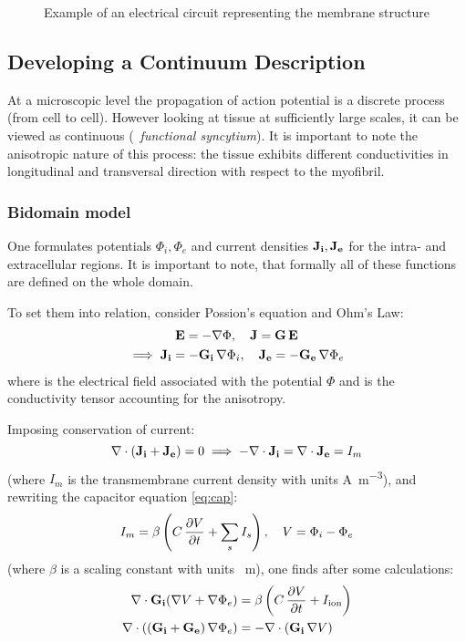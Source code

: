 \begin{figure}[h!]
    \centering
    
    \caption{Example of an electrical circuit representing the membrane structure}
    \label{fig:circut}
\end{figure}


\subsection{Developing a Continuum Description}
\label{sec:contdescr}
At a microscopic level the propagation of action potential is a discrete
process (from cell to cell). However looking at tissue at sufficiently large
scales, it can be viewed as continuous (\textrightarrow~\emph{functional
syncytium}). It is important to note the anisotropic nature of this process:
the tissue exhibits different conductivities in longitudinal and transversal
direction with respect to the myofibril.

\subsubsection{Bidomain model}
One formulates potentials $\Phi_i, \Phi_e$ and current densities $\mathbf{J_i},
\mathbf{J_e}$ for the intra- and extracellular regions.  It is important to
note, that formally all of these functions are defined on the whole domain.

To set them into relation, consider Possion's equation and Ohm's Law:
\begin{gather*}
    \mathbf{E}=-\nabla\Phi,\quad \mathbf{J}=\mathbf{G}\,\mathbf{E} \\
    \implies \mathbf{J_i}=-\mathbf{G_i}\,\nabla\Phi_i,\quad
    \mathbf{J_e}=-\mathbf{G_e}\,\nabla\Phi_e
\end{gather*}
where  is the electrical field associated with the potential $\Phi$
and  is the conductivity tensor accounting for the anisotropy.

Imposing conservation of current:
\begin{equation*}
    \nabla\cdot(\mathbf{J_i}+\mathbf{J_e})=0 \implies
    -\nabla\cdot\mathbf{J_i}=\nabla\cdot\mathbf{J_e}=I_m
\end{equation*}
(where $I_m$ is the transmembrane current density with units
\si{\ampere\per\metre\cubed}), and rewriting the capacitor equation
\eqref{eq:cap}:
\begin{equation*}
    I_m=\beta\left(C\,\pdv{V}{t}+\sum_{s}I_{s}\right),\quad V=\Phi_i-\Phi_e
\end{equation*}
(where $\beta$ is a scaling constant with units \si{\per\metre}), one finds
after some calculations:
\begin{subequations}
\begin{align}
    \nabla\cdot\mathbf{G_i}(\nabla{V}+\nabla\Phi_e)
    &=\beta\left(C\,\pdv{V}{t}+I_{\mathrm{ion}}\right)
    \label{eq:i}
    \\
    \nabla\cdot\left((\mathbf{G_i}+\mathbf{G_e})\,\nabla\Phi_e\right)
    &=-\nabla\cdot(\mathbf{G_i}\,\nabla{V})
    \label{eq:ii}
\end{align}
\end{subequations}

